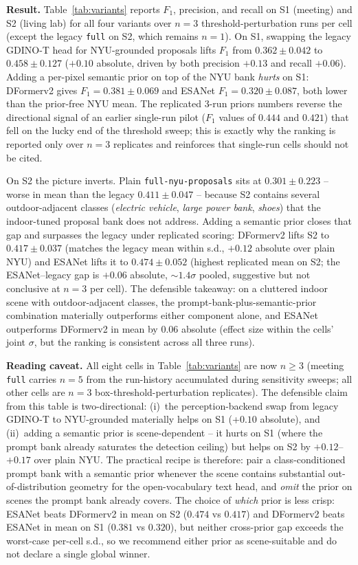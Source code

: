 \noindent\textbf{Result.}
Table~\ref{tab:variants} reports $F_1$, precision, and recall on S1
(meeting) and S2 (living lab) for all four variants over $n{=}3$
threshold-perturbation runs per cell (except the legacy \texttt{full}
on S2, which remains $n{=}1$). On S1, swapping the legacy GDINO-T
head for NYU-grounded proposals lifts $F_1$ from
$0.362 \pm 0.042$ to $0.458 \pm 0.127$ ($+0.10$ absolute, driven
by both precision $+0.13$ and recall $+0.06$). Adding a per-pixel
semantic prior on top of the NYU bank \emph{hurts} on S1: DFormerv2
gives $F_1{=}0.381 \pm 0.069$ and ESANet $F_1{=}0.320 \pm 0.087$,
both lower than the prior-free NYU mean. The replicated 3-run
priors numbers reverse the directional signal of an earlier
single-run pilot ($F_1$ values of $0.444$ and $0.421$) that fell on
the lucky end of the threshold sweep; this is exactly why the
ranking is reported only over $n{=}3$ replicates and reinforces
that single-run cells should not be cited.

On S2 the picture inverts. Plain \texttt{full-nyu-proposals} sits
at $0.301 \pm 0.223$ -- worse in mean than the legacy
$0.411 \pm 0.047$ -- because S2 contains several outdoor-adjacent
classes (\emph{electric vehicle}, \emph{large power bank},
\emph{shoes}) that the indoor-tuned proposal bank does not address.
Adding a semantic prior closes that gap and surpasses the legacy
under replicated scoring: DFormerv2 lifts S2 to
$0.417 \pm 0.037$ (matches the legacy mean within s.d., $+0.12$
absolute over plain NYU) and ESANet lifts it to $0.474 \pm 0.052$
(highest replicated mean on S2; the ESANet--legacy gap is
$+0.06$ absolute, $\sim 1.4\sigma$ pooled, suggestive but not
conclusive at $n{=}3$ per cell). The defensible takeaway: on a cluttered indoor scene
with outdoor-adjacent classes, the prompt-bank-plus-semantic-prior
combination materially outperforms either component alone, and
ESANet outperforms DFormerv2 in mean by $0.06$ absolute (effect
size within the cells' joint $\sigma$, but the ranking is
consistent across all three runs).

\noindent\textbf{Reading caveat.}
All eight cells in Table~\ref{tab:variants} are now $n{\geq}3$
(meeting \texttt{full} carries $n{=}5$ from the run-history
accumulated during sensitivity sweeps; all other cells are
$n{=}3$ box-threshold-perturbation replicates). The defensible claim from this table
is two-directional: (i)~the perception-backend swap from legacy
GDINO-T to NYU-grounded materially helps on S1 (+$0.10$ absolute),
and (ii)~adding a semantic prior is scene-dependent -- it hurts
on S1 (where the prompt bank already saturates the detection
ceiling) but helps on S2 by $+0.12$--$+0.17$ over plain NYU.
The practical recipe is therefore: pair a class-conditioned
prompt bank with a semantic prior whenever the scene contains
substantial out-of-distribution geometry for the open-vocabulary
text head, and \emph{omit} the prior on scenes the prompt bank
already covers. The choice of \emph{which} prior is less crisp:
ESANet beats DFormerv2 in mean on S2 ($0.474$ vs $0.417$) and
DFormerv2 beats ESANet in mean on S1 ($0.381$ vs $0.320$), but
neither cross-prior gap exceeds the worst-case per-cell s.d.,
so we recommend either prior as scene-suitable and do not
declare a single global winner.

